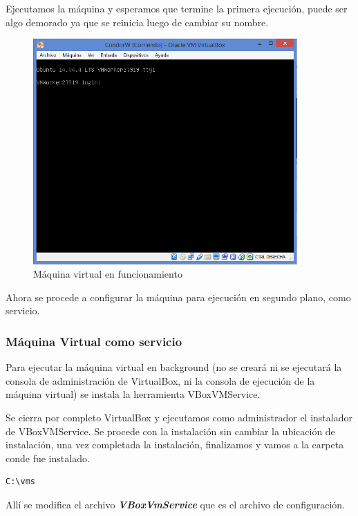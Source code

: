 Ejecutamos la máquina y esperamos que termine la primera ejecución, puede ser algo demorado ya que se reinicia luego de cambiar su nombre.

\begin{figure}[h]
\centering
\includegraphics[width=0.9\textwidth]{windows/running.PNG}
\decoRule
\caption{Máquina virtual en funcionamiento}
\label{fig:VM Running}
\end{figure}
\FloatBarrier

Ahora se procede a configurar la máquina para ejecución en segundo plano, como servicio.

\subsubsection*{Máquina Virtual como servicio}

Para ejecutar la máquina virtual en background (no se creará ni se ejecutará la consola de administración de VirtualBox, ni la consola de ejecución de la máquina virtual) se instala la herramienta VBoxVMService.

Se cierra por completo VirtualBox y ejecutamos como administrador el instalador de VBoxVMService.
Se procede con la instalación sin cambiar la ubicación de instalación, una vez completada la instalación, finalizamos y vamos a la carpeta conde fue instalado.

\begin{lstlisting}
C:\vms
\end{lstlisting}

Allí se modifica el archivo \textbf{\textit{VBoxVmService}} que es el archivo de configuración.


